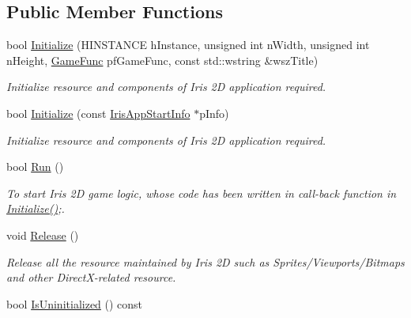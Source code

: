 \subsection*{Public Member Functions}
\begin{DoxyCompactItemize}
\item 
bool \hyperlink{class_iris2_d_1_1_iris_application_a84f3ddebb3a3ffb0c172bd41fb952e1a}{Initialize} (H\+I\+N\+S\+T\+A\+N\+CE h\+Instance, unsigned int n\+Width, unsigned int n\+Height, \hyperlink{class_iris2_d_1_1_iris_application_ac74720e6cd3a1968f73e92ea99675884}{Game\+Func} pf\+Game\+Func, const std\+::wstring \&wsz\+Title)
\begin{DoxyCompactList}\small\item\em Initialize resource and components of Iris 2D application required. \end{DoxyCompactList}\item 
bool \hyperlink{class_iris2_d_1_1_iris_application_ac20656815694f980fccfc4369727a9a9}{Initialize} (const \hyperlink{struct_iris2_d_1_1_iris_application_1_1_iris_app_start_info}{Iris\+App\+Start\+Info} $\ast$p\+Info)
\begin{DoxyCompactList}\small\item\em Initialize resource and components of Iris 2D application required. \end{DoxyCompactList}\item 
bool \hyperlink{class_iris2_d_1_1_iris_application_ae6bb59365978c945201fd8cf82105e4f}{Run} ()
\begin{DoxyCompactList}\small\item\em To start Iris 2D game logic, whose code has been written in call-\/back function in \hyperlink{class_iris2_d_1_1_iris_application_a84f3ddebb3a3ffb0c172bd41fb952e1a}{Initialize()};. \end{DoxyCompactList}\item 
\mbox{\label{class_iris2_d_1_1_iris_application_a486d999a8d9e96f21b9d064d10d15b96}} 
void \hyperlink{class_iris2_d_1_1_iris_application_a486d999a8d9e96f21b9d064d10d15b96}{Release} ()
\begin{DoxyCompactList}\small\item\em Release all the resource maintained by Iris 2D such as Sprites/\+Viewports/\+Bitmaps and other Direct\+X-\/related resource. \end{DoxyCompactList}\item 
bool \hyperlink{class_iris2_d_1_1_iris_application_a1035e03a186b934ecf57371e42475eea}{Is\+Uninitialized} () const

\end{DoxyCompactItemize}
